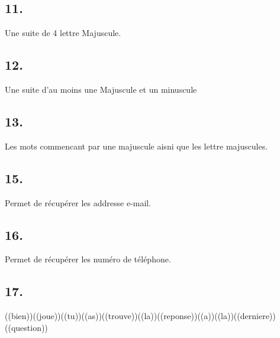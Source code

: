         \subsection{11.}
           Une suite de 4 lettre Majuscule.
        \subsection{12.}
            Une suite d'au moins une Majuscule et un minuscule
        \subsection{13.}
            Les mots commencant par une majuscule aisni que les lettre majuscules.
        \subsection{15.}
            Permet de récupérer les addresse e-mail.
        \subsection{16.}
            Permet de récupérer les numéro de téléphone.
        \subsection{17.}
            ((bien))((joue))((tu))((as))((trouve))((la))((reponse))((a))((la))((derniere))((question))
